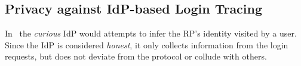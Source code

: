 




\subsection{Privacy against IdP-based Login Tracing}
\label{subsec:IdP-privacy}

In \usso\ the \emph{curious} IdP would attempts to infer the RP's identity visited by a user. Since the IdP is considered \emph{honest}, it only collects information from the login requests, %
 but does not deviate from the protocol or collude with others.

